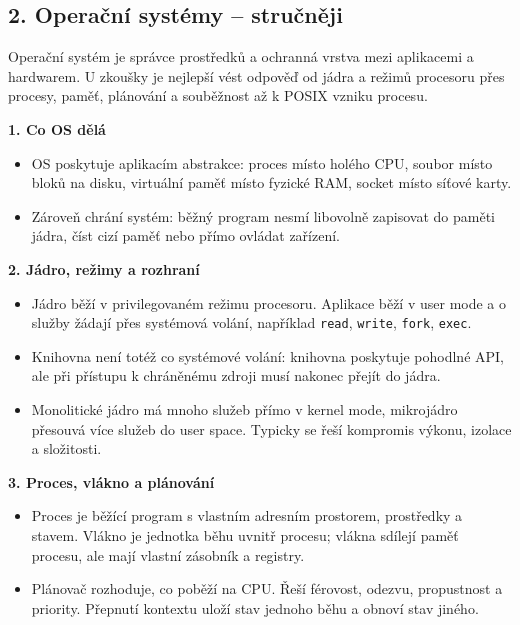 
\subsection*{2. Operační systémy -- stručněji}
Operační systém je správce prostředků a ochranná vrstva mezi aplikacemi a hardwarem. U zkoušky je nejlepší vést odpověď od jádra a režimů procesoru přes procesy, paměť, plánování a souběžnost až k POSIX vzniku procesu.

\textbf{1. Co OS dělá}
\begin{itemize}
  \item OS poskytuje aplikacím abstrakce: proces místo holého CPU, soubor místo bloků na disku, virtuální paměť místo fyzické RAM, socket místo síťové karty.
  \item Zároveň chrání systém: běžný program nesmí libovolně zapisovat do paměti jádra, číst cizí paměť nebo přímo ovládat zařízení.
\end{itemize}

\textbf{2. Jádro, režimy a rozhraní}
\begin{itemize}
  \item Jádro běží v privilegovaném režimu procesoru. Aplikace běží v user mode a o služby žádají přes systémová volání, například \texttt{read}, \texttt{write}, \texttt{fork}, \texttt{exec}.
  \item Knihovna není totéž co systémové volání: knihovna poskytuje pohodlné API, ale při přístupu k chráněnému zdroji musí nakonec přejít do jádra.
  \item Monolitické jádro má mnoho služeb přímo v kernel mode, mikrojádro přesouvá více služeb do user space. Typicky se řeší kompromis výkonu, izolace a složitosti.
\end{itemize}

\textbf{3. Proces, vlákno a plánování}
\begin{itemize}
  \item Proces je běžící program s vlastním adresním prostorem, prostředky a stavem. Vlákno je jednotka běhu uvnitř procesu; vlákna sdílejí paměť procesu, ale mají vlastní zásobník a registry.
  \item Plánovač rozhoduje, co poběží na CPU. Řeší férovost, odezvu, propustnost a priority. Přepnutí kontextu uloží stav jednoho běhu a obnoví stav jiného.
\end{itemize}

